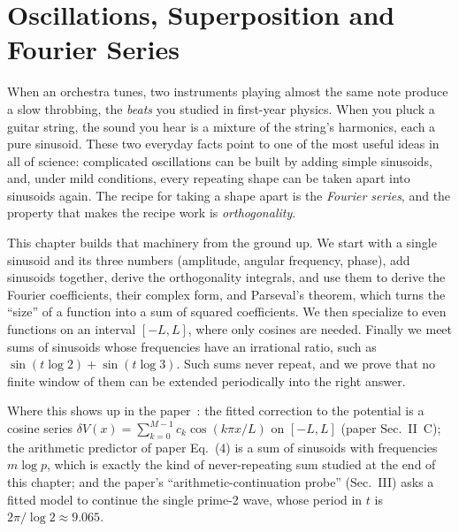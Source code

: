 \chapter{Oscillations, Superposition and Fourier Series}\label{ch:fourier-series}

\begin{chapterintro}
When an orchestra tunes, two instruments playing almost the same note produce a slow throbbing, the \emph{beats} you studied in first-year physics. When you pluck a guitar string, the sound you hear is a mixture of the string's harmonics, each a pure sinusoid. These two everyday facts point to one of the most useful ideas in all of science: complicated oscillations can be built by adding simple sinusoids, and, under mild conditions, every repeating shape can be taken apart into sinusoids again. The recipe for taking a shape apart is the \emph{Fourier series}, and the property that makes the recipe work is \emph{orthogonality}.

This chapter builds that machinery from the ground up. We start with a single sinusoid and its three numbers (amplitude, angular frequency, phase), add sinusoids together, derive the orthogonality integrals, and use them to derive the Fourier coefficients, their complex form, and Parseval's theorem, which turns the ``size'' of a function into a sum of squared coefficients. We then specialize to even functions on an interval $[-L,L]$, where only cosines are needed. Finally we meet sums of sinusoids whose frequencies have an irrational ratio, such as $\sin(t\log 2)+\sin(t\log 3)$. Such sums never repeat, and we prove that no finite window of them can be extended periodically into the right answer.

Where this shows up in the paper~\cite{soniR1}: the fitted correction to the potential is a cosine series $\delta V(x)=\sum_{k=0}^{M-1}c_k\cos(k\pi x/L)$ on $[-L,L]$ (paper Sec.~II~C); the arithmetic predictor of paper Eq.~(4) is a sum of sinusoids with frequencies $m\log p$, which is exactly the kind of never-repeating sum studied at the end of this chapter; and the paper's ``arithmetic-continuation probe'' (Sec.~III) asks a fitted model to continue the single prime-2 wave, whose period in $t$ is $2\pi/\log 2\approx 9.065$.
\end{chapterintro}

